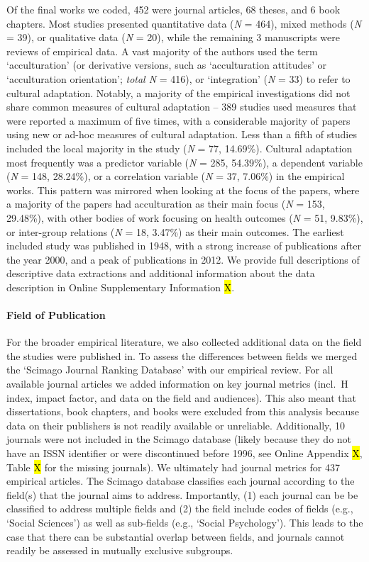 Of the final works we coded, 452 were journal articles, 68 theses, and 6
book chapters. Most studies presented quantitative data (\textit{N} =
464), mixed methods (\textit{N} = 39), or qualitative data (\textit{N} =
20), while the remaining 3 manuscripts were reviews of empirical data. A
vast majority of the authors used the term `acculturation' (or
derivative versions, such as `acculturation attitudes' or `acculturation
orientation'; \textit{total N} = 416), or `integration' (\textit{N} =
33) to refer to cultural adaptation. Notably, a majority of the
empirical investigations did not share common measures of cultural
adaptation -- 389 studies used measures that were reported a maximum of
five times, with a considerable majority of papers using new or ad-hoc
measures of cultural adaptation. Less than a fifth of studies included
the local majority in the study (\textit{N} = 77, 14.69\%). Cultural
adaptation most frequently was a predictor variable (\textit{N} = 285,
54.39\%), a dependent variable (\textit{N} = 148, 28.24\%), or a
correlation variable (\textit{N} = 37, 7.06\%) in the empirical works.
This pattern was mirrored when looking at the focus of the papers, where
a majority of the papers had acculturation as their main focus
(\textit{N} = 153, 29.48\%), with other bodies of work focusing on
health outcomes (\textit{N} = 51, 9.83\%), or inter-group relations
(\textit{N} = 18, 3.47\%) as their main outcomes. The earliest included
study was published in 1948, with a strong increase of publications
after the year 2000, and a peak of publications in 2012. We provide full
descriptions of descriptive data extractions and additional information
about the data description in Online Supplementary Information \hl{X}.

\paragraph{Field of Publication}

For the broader empirical literature, we also collected additional data
on the field the studies were published in. To assess the differences
between fields we merged the `Scimago Journal Ranking Database'
\citep{SCImago2020} with our empirical review. For all available journal
articles we added information on key journal metrics (incl.~H index,
impact factor, and data on the field and audiences). This also meant
that dissertations, book chapters, and books were excluded from this
analysis because data on their publishers is not readily available or
unreliable. Additionally, 10 journals were not included in the Scimago
database (likely because they do not have an ISSN identifier or were
discontinued before 1996, see Online Appendix \hl{X}, Table \hl{X} for
the missing journals). We ultimately had journal metrics for 437
empirical articles. The Scimago database classifies each journal
according to the field(s) that the journal aims to address. Importantly,
(1) each journal can be be classified to address multiple fields and (2)
the field include codes of fields (e.g., `Social Sciences') as well as
sub-fields (e.g., `Social Psychology'). This leads to the case that
there can be substantial overlap between fields, and journals cannot
readily be assessed in mutually exclusive subgroups.

